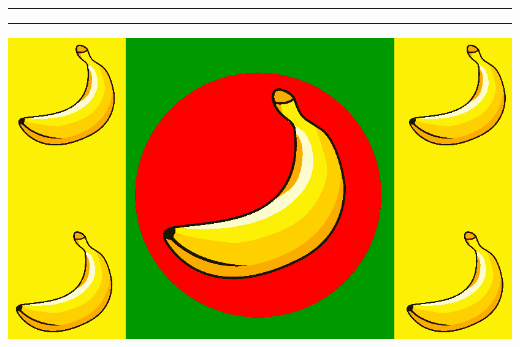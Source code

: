 \documentclass{memoir}
\begin{document}
\rule{1.2\textwidth}{2pt}
\lipsum[1]
\clearpage
\lipsum[1]
\clearpage
\lipsum[1]
\clearpage
\lipsum[1]

\rule{1.2\textwidth}{2pt}

\clearpage

\includegraphics[width=1.5\textwidth]{banana}
\end{document}
